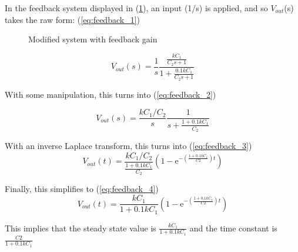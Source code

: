 In the feedback system displayed in (\ref{fig:fig_2}), an input (1/s) is applied, and so $V_{out}$(s) takes the raw form: (\ref{eq:feedback_1})

\begin{figure}[h!]
	\centering
	\caption{Modified system with feedback gain}
	\label{fig:fig_2}
\end{figure}

\begin{equation}
	\label{eq:feedback_1}
	V_{out}(s) = \frac{1}{s}\frac{\frac{k C_{1}}{C_{2}s + 1}}{1 +\frac{0.1k C_{1}}{C_{2} s + 1}}
\end{equation}

With some manipulation, this turns into (\ref{eq:feedback_2})

\begin{equation}
    \label{eq:feedback_2}
    V_{out}(s) = \frac{k C_{1}/C_{2}}{s}\frac{1}{s+\frac{1+0.1k C_{1}}{C_{2}}}
\end{equation}

With an inverse Laplace transform, this turns into (\ref{eq:feedback_3})
\begin{equation}
    \label{eq:feedback_3}
    V_{out}(t) = \frac{k C_{1}/C_{2}}{\frac{1+0.1k C_{1}}{C_{2}}}(1-\mathrm{e}^{-(\frac{1+0.1 k C_{1}}{C2})t})
\end{equation}

Finally, this simplifies to (\ref{eq:feedback_4})
\begin{equation}
    \label{eq:feedback_4}
    V_{out}(t) = \frac{k C_{1}}{1+0.1k C_{1}}(1-\mathrm{e}^{-(\frac{1+0.1 k C_{1}}{C2})t})
\end{equation}

This implies that the steady state value is $\frac{k C_{1}}{1+0.1k C_{1}}$
and the time constant is $\frac{C2}{1+0.1 k C_{1}}$ 